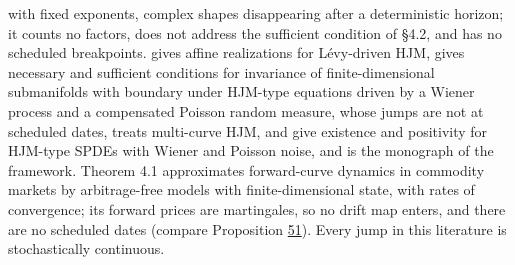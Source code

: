\documentclass[11pt]{article}
\begin{document}
with fixed exponents, complex shapes disappearing after a deterministic horizon; it counts no factors, does not address the sufficient condition of \cite{sharef2004conditions} §4.2, and has no scheduled breakpoints. \cite{tappe2012existence} gives affine realizations for Lévy-driven HJM, \cite{filipovic2012invariant} gives necessary and sufficient conditions for invariance of finite-dimensional submanifolds with boundary under HJM-type equations driven by a Wiener process and a compensated Poisson random measure, whose jumps are not at scheduled dates, \cite{fontana2024geometry} treats multi-curve HJM, \cite{filipovic2010term} and \cite{filipovic2010jump} give existence and positivity for HJM-type SPDEs with Wiener and Poisson noise, and \cite{filipovic2001consistency} is the monograph of the framework. \cite{benth2018approximation} Theorem 4.1 approximates forward-curve dynamics in commodity markets by arbitrage-free models with finite-dimensional state, with rates of convergence; its forward prices are martingales, so no drift map enters, and there are no scheduled dates (compare Proposition \hyperref[res:Proposition-51]{51}). Every jump in this literature is stochastically continuous.
\end{document}
